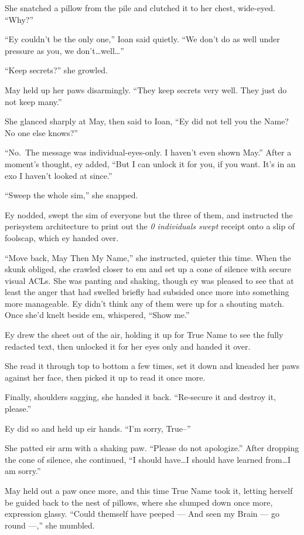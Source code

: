 She snatched a pillow from the pile and clutched it to her chest, wide-eyed. ``Why?''

``Ey couldn't be the only one,'' Ioan said quietly. ``We don't do as well under pressure as you, we don't\ldots well\ldots{}''

``Keep secrets?'' she growled.

May held up her paws disarmingly. ``They keep secrets very well. They just do not keep many.''

She glanced sharply at May, then said to Ioan, ``Ey did not tell you the Name? No one else knows?''

``No.~The message was individual-eyes-only. I haven't even shown May.'' After a moment's thought, ey added, ``But I can unlock it for you, if you want. It's in an exo I haven't looked at since.''

``Sweep the whole sim,'' she snapped.

Ey nodded, swept the sim of everyone but the three of them, and instructed the perisystem architecture to print out the \emph{0 individuals swept} receipt onto a slip of foolscap, which ey handed over.

``Move back, May Then My Name,'' she instructed, quieter this time. When the skunk obliged, she crawled closer to em and set up a cone of silence with secure visual ACLs. She was panting and shaking, though ey was pleased to see that at least the anger that had swelled briefly had subsided once more into something more manageable. Ey didn't think any of them were up for a shouting match. Once she'd knelt beside em, whispered, ``Show me.''

Ey drew the sheet out of the air, holding it up for True Name to see the fully redacted text, then unlocked it for her eyes only and handed it over.

She read it through top to bottom a few times, set it down and kneaded her paws against her face, then picked it up to read it once more.

Finally, shoulders sagging, she handed it back. ``Re-secure it and destroy it, please.''

Ey did so and held up eir hands. ``I'm sorry, True--''

She patted eir arm with a shaking paw. ``Please do not apologize.'' After dropping the cone of silence, she continued, ``I should have\ldots I should have learned from\ldots I am sorry.''

May held out a paw once more, and this time True Name took it, letting herself be guided back to the nest of pillows, where she slumped down once more, expression glassy. ``Could themself have peeped — And seen my Brain — go round —,'' she mumbled.

